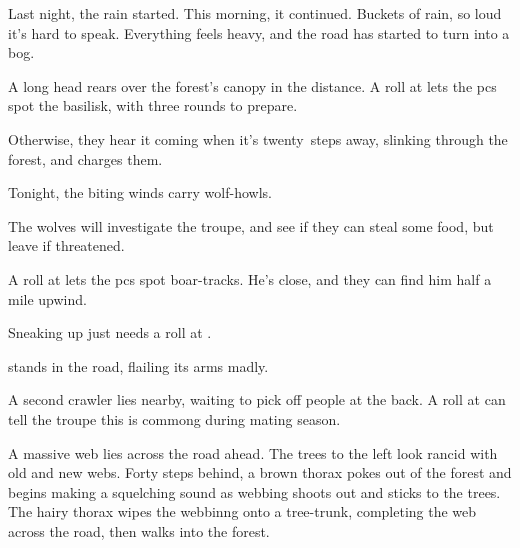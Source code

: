 \ifcase\value{cycle}


\begin{boxtext}
  Last night, the rain started.
  This morning, it continued.
  Buckets of rain, so loud it's hard to speak.
  Everything feels heavy, and the road has started to turn into a bog.
\end{boxtext}

A long head rears over the forest's canopy in the distance.
A  roll at \tn[10] lets the \glspl{pc} spot the \gls{basilisk}, with three \glspl{round} to prepare.

Otherwise, they hear it coming when it's twenty~\glspl{step} away, slinking through the forest, and charges them.

\basilisk

\or%

\begin{boxtext}
  Tonight, the biting winds carry wolf-howls.
\end{boxtext}

The wolves will investigate the troupe, and see if they can steal some food, but leave if threatened.

\wolf

\or%

A  roll at \tn[10] lets the \glspl{pc} spot boar-tracks.
He's close, and they can find him half a mile upwind.

\boar

Sneaking up just needs a  roll at
\tn.

\or%

\begin{boxtext}
   stands in the road, flailing its arms madly.
\end{boxtext}

A second \gls{crawler} lies nearby, waiting to pick off people at the back.
A  roll at \tn[10] can tell the troupe this is commong during mating season.

\chitincrawler
\label{crawlerStatblock}

\chitincrawler

\or%

\begin{boxtext}
  A massive web lies across the road ahead.
  The trees to the left look rancid with old and new webs.
  Forty \glspl{step} behind, a brown thorax pokes out of the forest and begins making a squelching sound as webbing shoots out and sticks to the trees.
  The hairy thorax wipes the webbinng onto a tree-trunk, completing the web across the road, then walks into the forest.
\end{boxtext}


